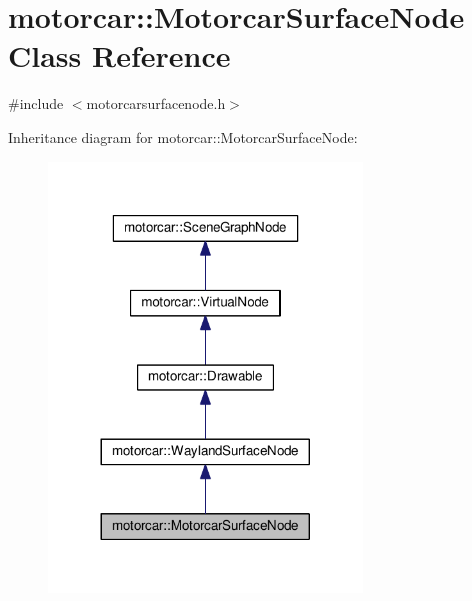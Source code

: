 \hypertarget{classmotorcar_1_1MotorcarSurfaceNode}{\section{motorcar\-:\-:Motorcar\-Surface\-Node Class Reference}
\label{classmotorcar_1_1MotorcarSurfaceNode}
}


{\ttfamily \#include $<$motorcarsurfacenode.\-h$>$}



Inheritance diagram for motorcar\-:\-:Motorcar\-Surface\-Node\-:
\nopagebreak
\begin{figure}[H]
\begin{center}
\leavevmode
\includegraphics[width=236pt]{classmotorcar_1_1MotorcarSurfaceNode__inherit__graph}
\end{center}
\end{figure}


